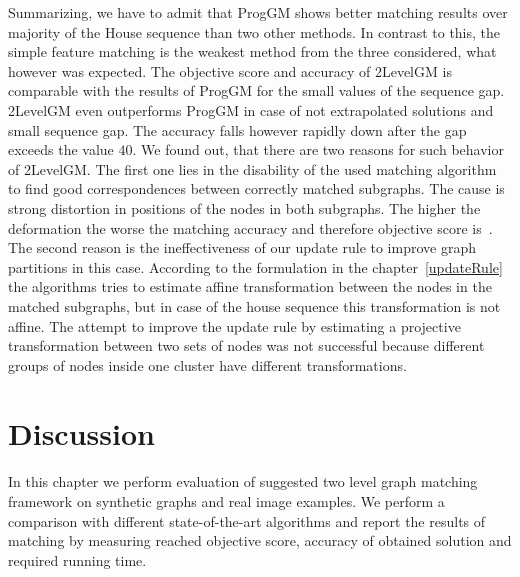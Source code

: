 Summarizing, we have to admit that ProgGM shows better matching results over majority of the House sequence than two other methods. In contrast to this, the simple feature matching is the weakest method from the three considered, what however was expected. The objective score and accuracy of 2LevelGM is comparable with the results of ProgGM for the small values of the sequence gap. 2LevelGM even outperforms ProgGM in case of not extrapolated solutions and small sequence gap. The accuracy falls however rapidly down after the gap exceeds the value $40$. We found out, that there are two reasons for such behavior of 2LevelGM. The first one lies in the disability of the used matching algorithm to find good correspondences between correctly matched subgraphs. The cause is strong distortion in positions of the nodes in both subgraphs. The higher the deformation the worse the matching accuracy and therefore objective score is~\cite{Cho2010_RRWM}.
The second reason is the ineffectiveness of our update rule to improve graph partitions in this case. According to the formulation in the chapter~\ref{updateRule} the algorithms tries to estimate affine transformation between the nodes in the matched subgraphs, but in case of the house sequence this transformation is not affine. The attempt to improve the update rule by estimating a projective transformation between two sets of nodes was not successful because different groups of nodes inside one cluster have different transformations.

\FloatBarrier


\section{Discussion}

In this chapter we perform evaluation of suggested two level graph matching framework on synthetic graphs and real image examples. We perform a comparison with different state-of-the-art algorithms and report the results of matching by measuring reached objective score, accuracy of obtained solution and required running time.

